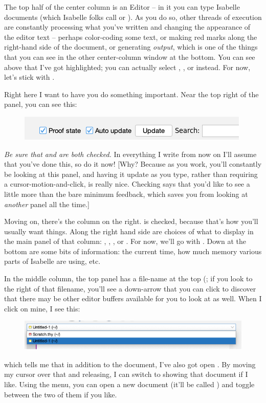 The top half of the center column is an Editor -- in it you can type Isabelle documents (which Isabelle folks call  or ). As you do so, other threads of execution are constantly processing what you've written and changing the appearance of the editor text -- perhaps color-coding some text, or making red marks along the right-hand side of the document, or generating \textit{output}, which is one of the things that you can see in the other center-column window at the bottom. You can see above that I've got  highlighted; you can actually select , , or  instead. For now, let's stick with . 

Right here I want to have you do something important. Near the top right of the 
 panel, you can see this:
\begin{figure}[h]
    \centering
    \includegraphics[width=0.75\linewidth]{image.png}
\end{figure}
\textit{Be sure that  and  are both checked.} In everything I write from now on I'll assume that you've done this, so do it now! [Why? Because as you work, you'll constantly be looking at this panel, and having it update as you type, rather than requiring a cursor-motion-and-click, is really nice. Checking  says that you'd like to see a little more than the bare minimum feedback, which saves you from looking at \textit{another} panel all the time.]

Moving on, there's the column on the right.  is checked, because that's how you'll usually want things. Along the right hand side are choices of what to display in the main panel of that column: , , , or . For now, we'll go with . Down at the bottom are some bits of information: the current time, how much memory various parts of Isabelle are using, etc. 

In the middle column, the top panel has a file-name at the top (; if you look to the right of that filename, you'll see a down-arrow that you can click to discover that there may be other editor buffers available for you to look at as well. When I click on mine, I see this:
\begin{figure}
    \centering
    \includegraphics[width=1\linewidth]{file-list.png}
\end{figure}
which tells me that in addition to the  document, I've also got open . By moving my cursor over that and releasing, I can switch to showing that document if I like. Using the  menu, you can open a new document (it'll be called ) and toggle between the two of them if you like.

